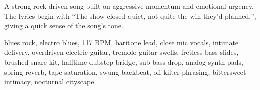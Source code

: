 

\begin{notes}
A strong rock-driven song built on aggressive momentum and emotional urgency. %
The lyrics begin with “The show closed quiet, not quite the win they'd planned,”, giving a quick sense of the song’s tone.
\end{notes}

\begin{style}
blues rock, electro blues, 117 BPM, baritone lead, close mic vocals, intimate delivery, overdriven electric guitar, tremolo guitar swells, fretless bass slides, brushed snare kit, halftime dubstep bridge, sub-bass drop, analog synth pads, spring reverb, tape saturation, swung backbeat, off-kilter phrasing, bittersweet intimacy, nocturnal cityscape
\end{style}

